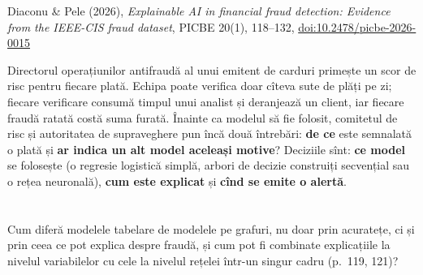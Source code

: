 
\renewcommand{\emqacase}{\T{Research case 1 (Lectures 3 and 11)}{Studiul de caz 1 (cursurile 3 și 11)}}

%
          { Diaconu \& Pele (2026), \emph{Explainable AI in financial fraud detection: Evidence from the IEEE-CIS fraud dataset},
           PICBE 20(1), 118--132, \href{https://doi.org/10.2478/picbe-2026-0015}{doi:10.2478/picbe-2026-0015}}

\begin{scenario}
%
{Directorul operațiunilor antifraudă al unui emitent de carduri primește un scor de risc pentru fiecare plată. Echipa poate verifica doar cîteva sute de plăți pe zi; fiecare verificare consumă timpul unui analist și deranjează un client, iar fiecare fraudă ratată costă suma furată.
Înainte ca modelul să fie folosit, comitetul de risc și autoritatea de supraveghere pun încă două întrebări: \textbf{de ce} este semnalată o plată și \textbf{ar indica un alt model aceleași motive}?
Deciziile sînt: \textbf{ce model} se folosește (o regresie logistică simplă, arbori de decizie construiți secvențial sau o rețea neuronală), \textbf{cum este explicat} și \textbf{cînd se emite o alertă}.}
\end{scenario}

\section{}
\textbf{} %
{Cum diferă modelele tabelare de modelele pe grafuri, nu doar prin acuratețe, ci și prin ceea ce pot explica despre fraudă, și cum pot fi combinate explicațiile la nivelul variabilelor cu cele la nivelul rețelei într-un singur cadru (p.~119, 121)?}

